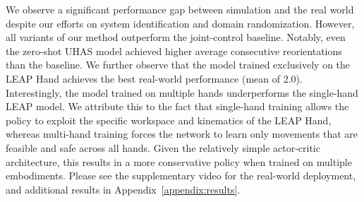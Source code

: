 We observe a significant performance gap between simulation and the real world despite our efforts on system identification and domain randomization. However, all variants of our method outperform the joint-control baseline. Notably, even the zero-shot UHAS model achieved higher average consecutive reorientations than the baseline. We further observe that the model trained exclusively on the LEAP Hand achieves the best real-world performance (mean of 2.0). Interestingly, the model trained on multiple hands underperforms the single-hand LEAP model. We attribute this to the fact that single-hand training allows the policy to exploit the specific workspace and kinematics of the LEAP Hand, whereas multi-hand training forces the network to learn only movements that are feasible and safe across all hands. Given the relatively simple actor-critic architecture, this results in a more conservative policy when trained on multiple embodiments. Please see the supplementary video for the real-world deployment, and additional results in Appendix~\ref{appendix:results}.









